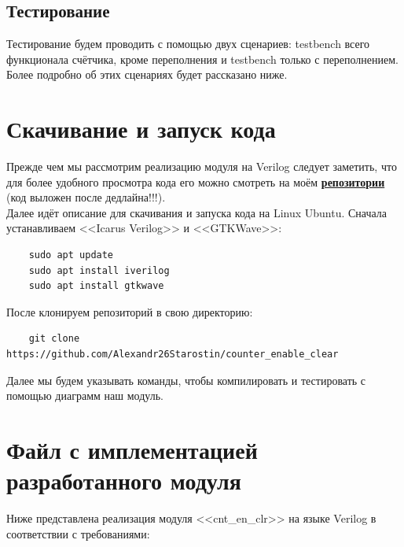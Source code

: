 \documentclass[12pt, a4paper]{article}
\begin{document}
	\subsection{Тестирование}
	
	Тестирование будем проводить с помощью двух сценариев: testbench всего функционала счётчика, кроме переполнения и testbench только с переполнением. Более подробно об этих сценариях будет рассказано ниже.
	
\section{Скачивание и запуск кода}

Прежде чем мы рассмотрим реализацию модуля на Verilog следует заметить, что для более удобного просмотра кода его можно смотреть на моём \href{https://github.com/Alexandr26Starostin/counter_enable_clear}{\textbf{репозитории}} (код выложен после дедлайна!!!). \\

Далее идёт описание для скачивания и запуска кода на Linux Ubuntu. Сначала устанавливаем <<Icarus Verilog>> и <<GTKWave>>:
\begin{verbatim}
	sudo apt update
	sudo apt install iverilog
	sudo apt install gtkwave
\end{verbatim}

После клонируем репозиторий в свою директорию:
\begin{verbatim}
	git clone https://github.com/Alexandr26Starostin/counter_enable_clear
\end{verbatim}

Далее мы будем указывать команды, чтобы компилировать и тестировать с помощью диаграмм наш модуль. 
	
	\section{Файл с имплементацией разработанного модуля}

Ниже представлена реализация модуля <<cnt\_en\_clr>> на языке Verilog в соответствии с требованиями: \\
	
\end{document}
